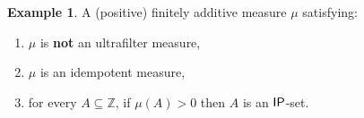 \documentclass{jloganal}
\theoremstyle{definition}
\newtheorem{ex}[thm]{Example}
\newcommand{\ip}{\mathnormal{\mathsf{IP}}}
\begin{document}
 \begin{ex}\label{example-combination-ultrafilters}
     A (positive) finitely additive measure $\mu$ satisfying:
\begin{enumerate}
    \item $\mu$ is {\bf not} an ultrafilter measure,
    \item $\mu$ is an idempotent measure,
    \item for every $A\subseteq\mathbb Z$, if $\mu(A)>0$ then $A$ is an $\ip$-set.
\end{enumerate} 
\end{ex}
\end{document}
